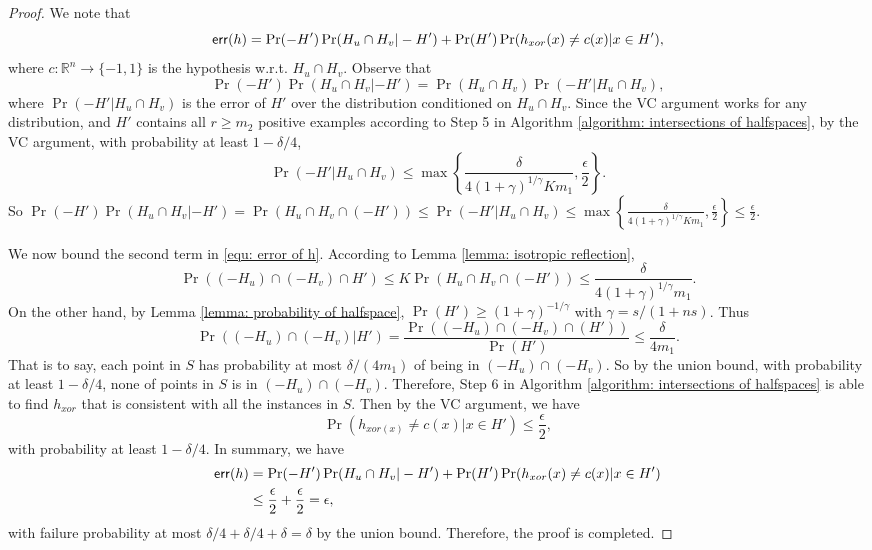 \documentclass[11pt]{article}
\newcommand{\R}{\mathbb{R}}
\newcommand{\err}{\textup{\textsf{err}}}
\begin{document}
{{{{\begin{proof}
We note that
\begin{equation}
\label{equ: error of h}
\err(h)=\Pr(-H')\Pr(H_u\cap H_v|-H')+\Pr(H')\Pr(h_{xor}(x)\not=c(x)|x\in H'),
\end{equation}
where $c:\R^n\rightarrow \{-1,1\}$ is the hypothesis w.r.t. $H_u\cap H_v$. Observe that
\begin{equation*}
\Pr(-H')\Pr(H_u\cap H_v|-H')=\Pr(H_u\cap H_v)\Pr(-H'|H_u\cap H_v),
\end{equation*}
where $\Pr(-H'|H_u\cap H_v)$ is the error of $H'$ over the distribution conditioned on $H_u\cap H_v$. Since the VC argument works for any distribution, and $H'$ contains all $r\ge m_2$ positive examples according to Step 5 in Algorithm \ref{algorithm: intersections of halfspaces}, by the VC argument, with probability at least $1-\delta/4$,
\begin{equation*}
\Pr(-H'|H_u\cap H_v)\le \max\left\{\frac{\delta}{4(1+\gamma)^{1/\gamma} Km_1},\frac{\epsilon}{2}\right\}.
\end{equation*}
So
$
\Pr(-H')\Pr(H_u\cap H_v|-H')=\Pr(H_u\cap H_v\cap (-H'))\le \Pr(-H'|H_u\cap H_v)\le \max\left\{\frac{\delta}{4(1+\gamma)^{1/\gamma}Km_1},\frac{\epsilon}{2}\right\}\le \frac{\epsilon}{2}.
$

We now bound the second term in \eqref{equ: error of h}. According to Lemma \ref{lemma: isotropic reflection},
\begin{equation*}
\Pr((-H_u)\cap(-H_v)\cap H')\le K\Pr(H_u\cap H_v\cap (-H'))\le \frac{\delta}{4(1+\gamma)^{1/\gamma}m_1}.
\end{equation*}
On the other hand, by Lemma \ref{lemma: probability of halfspace}, $\Pr(H')\ge (1+\gamma)^{-1/\gamma}$ with $\gamma=s/(1+ns)$. Thus
\begin{equation*}
\Pr((-H_u)\cap (-H_v)|H')=\frac{\Pr((-H_u)\cap(-H_v)\cap(H'))}{\Pr(H')}\le \frac{\delta}{4m_1}.
\end{equation*}
That is to say, each point in $S$ has probability at most $\delta/(4m_1)$ of being in $(-H_u)\cap(-H_v)$. So by the union bound, with probability at least $1-\delta/4$, none of points in $S$ is in $(-H_u)\cap(-H_v)$. Therefore, Step 6 in Algorithm \ref{algorithm: intersections of halfspaces} is able to find $h_{xor}$ that is consistent with all the instances in $S$. Then by the VC argument, we have
\begin{equation*}
\Pr(h_{xor(x)}\not= c(x)|x\in H')\le \frac{\epsilon}{2},
\end{equation*}
with probability at least $1-\delta/4$. In summary, we have
\begin{equation*}
\begin{split}
\err(h)&=\Pr(-H')\Pr(H_u\cap H_v|-H')+\Pr(H')\Pr(h_{xor}(x)\not=c(x)|x\in H')\\
&\le \frac{\epsilon}{2}+\frac{\epsilon}{2}=\epsilon,
\end{split}
\end{equation*}
with failure probability at most $\delta/4+\delta/4+\delta=\delta$ by the union bound. Therefore, the proof is completed.
\end{proof}


}}}}
\end{document}
